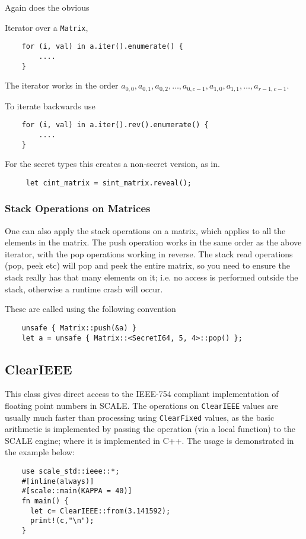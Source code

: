 Again does the obvious


Iterator over a \verb|Matrix|,
\begin{lstlisting}
    for (i, val) in a.iter().enumerate() {
        ....
    }
\end{lstlisting}
The iterator works in the order
$a_{0,0}, a_{0,1}, a_{0,2}, \ldots, a_{0,c-1}, a_{1,0}, a_{1,1}, \ldots, a_{r-1,c-1}$.

\noindent
To iterate backwards use
\begin{lstlisting}
    for (i, val) in a.iter().rev().enumerate() {
        ....
    }
\end{lstlisting}

For the secret types this creates a non-secret version, as in.
\begin{lstlisting}
     let cint_matrix = sint_matrix.reveal();
\end{lstlisting}

\subsubsection{Stack Operations on Matrices}
One can also apply the stack operations on a matrix, which
applies to all the elements in the matrix.
The push operation works in the same order as the above
iterator, with the pop operations working in reverse.
The stack read operations (pop, peek etc) will pop and peek
the entire matrix, so you need to ensure the stack really has
that many elements on it; i.e. no access is performed outside
the stack, otherwise a runtime crash will occur.

These are called using the following convention
\begin{lstlisting}
    unsafe { Matrix::push(&a) }
    let a = unsafe { Matrix::<SecretI64, 5, 4>::pop() };
\end{lstlisting}

\subsection{ClearIEEE}
This class gives direct access to the IEEE-754 compliant implementation
of floating point numbers in SCALE.
The operations on \verb|ClearIEEE| values are usually much
faster than processing using \verb|ClearFixed| values, as
the basic arithmetic is implemented by passing the operation
(via a local function) to the SCALE engine; where it is implemented
in C++.
The usage is demonstrated in the example below:
\begin{lstlisting}
    use scale_std::ieee::*;
    #[inline(always)]
    #[scale::main(KAPPA = 40)]
    fn main() {
      let c= ClearIEEE::from(3.141592);
      print!(c,"\n");
    }
\end{lstlisting}

